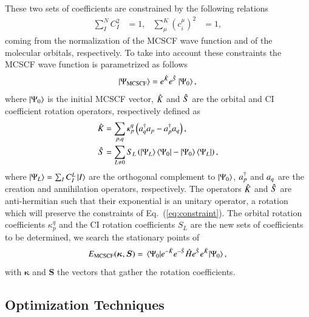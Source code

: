 \documentclass[aip,jcp,reprint,noshowkeys,superscriptaddress]{revtex4-1}
\begin{document}
These two sets of coefficients are constrained by the following relations
\begin{align}
  \label{eq:constraint}
  \sum_I^N C^2_I &= 1, & \sum^K_\mu (c_i^\mu)^2 &= 1,
\end{align}
coming from the normalization of the MCSCF wave function and of the molecular orbitals, respectively.
To take into account these constraints the MCSCF wave function is parametrized as follows
\begin{equation}
  \label{eq:mcscf_wf}
  \ket{\Psi_{\text{MCSCF}}}=e^{\Hat{K}}e^{\Hat{S}}\ket{\Psi_0},
\end{equation}
where $\ket{\Psi_0}$ is the initial MCSCF vector, $\Hat{K}$ and $\Hat{S}$ are the orbital and CI coefficient rotation operators, respectively defined as
\begin{align}
  \Hat{K} &= \sum_{p,q} \kappa_p^q \left( a_{q}^\dagger a_{p} - a_{p}^\dagger a_{q} \right),  \\
  \Hat{S} &= \sum_{L \neq 0} S_{L}\left(\ket{\Psi_L}\bra{\Psi_0}-\ket{\Psi_0}\bra{\Psi_L}\right),
\end{align}
where $\ket{\Psi_{L}} = \sum_I C_I^L\ket{I} $ are the orthogonal complement to $\ket{\Psi_0}$, $a_{p}^\dagger$ and $a_{q}$ are the creation and annihilation operators, respectively.
The operators $\Hat{K}$ and $\Hat{S}$ are anti-hermitian such that their exponential is an unitary operator, \ie a rotation which will preserve the constraints of Eq.~(\ref{eq:constraint}).
The orbital rotation coefficients $\kappa_p^q$ and the CI rotation coefficients $S_{L}$ are the new sets of coefficients to be determined, \ie we search the stationary points of
\begin{equation}
  \label{eq:mcscf_nrj}
  E_{\text{MCSCF}}(\bm{\kappa},\bm{S}) = \mel{\Psi_0}{e^{-\Hat{K}}e^{-\Hat{S}} \Hat{H}e^{\Hat{S}}e^{\Hat{K}}}{\Psi_0},
\end{equation}
with $\bm{\kappa}$ and $\bm{S}$ the vectors that gather the rotation coefficients.

\subsection{Optimization Techniques}
\label{subsec:optimization}
\end{document}
